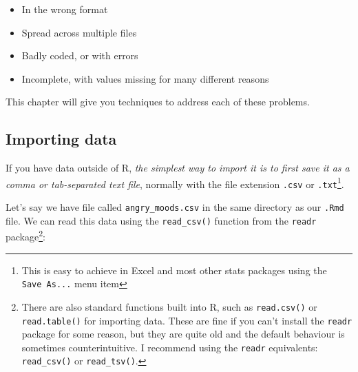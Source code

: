 \documentclass[]{article}
\providecommand{\tightlist}{%
  \setlength{\itemsep}{0pt}\setlength{\parskip}{0pt}}
\let\rmarkdownfootnote\footnote%
\def\footnote{\protect\rmarkdownfootnote}
\begin{document}
\begin{itemize}
\tightlist
\item
  In the wrong format
\item
  Spread across multiple files
\item
  Badly coded, or with errors
\item
  Incomplete, with values missing for many different reasons
\end{itemize}

This chapter will give you techniques to address each of these problems.

\hypertarget{importing-data}{%
\subsection*{Importing data}\label{importing-data}}

If you have data outside of R, \emph{the simplest way to import it is to first save
it as a comma or tab-separated text file}, normally with the file extension
\texttt{.csv} or \texttt{.txt}\footnote{This is easy to achieve in Excel and most other stats packages
  using the \texttt{Save\ As...} menu item}.

Let's say we have file called \texttt{angry\_moods.csv} in the same directory as our
\texttt{.Rmd} file. We can read this data using the \texttt{read\_csv()} function from the
\texttt{readr} package\footnote{There are also standard functions built into R, such as \texttt{read.csv()} or
  \texttt{read.table()} for importing data. These are fine if you can't install the
  \texttt{readr} package for some reason, but they are quite old and the default
  behaviour is sometimes counterintuitive. I recommend using the \texttt{readr}
  equivalents: \texttt{read\_csv()} or \texttt{read\_tsv()}.}:
\end{document}
